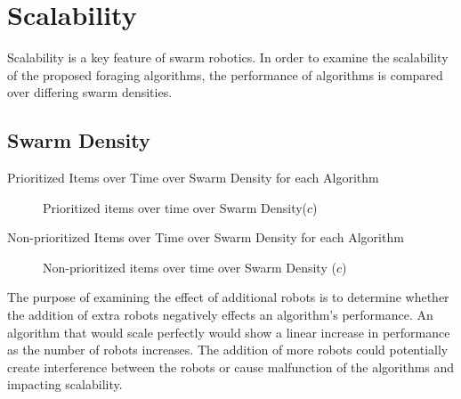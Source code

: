 \section{Scalability}
\label{results:scability}
Scalability is a key feature of swarm robotics. In order to examine the scalability of the proposed foraging algorithms, the performance of algorithms is compared over differing swarm densities. 

\subsection{Swarm Density}
\label{results:numberenvironments}

\begin{table} [h]
     \caption{Prioritized Items over Time over Swarm Density for each Algorithm}
     \label{specializationprioritized}
	\centering
	\footnotesize
	
\end{table}
\begin{figure}[!htb]
\centering
\resizebox{\textwidth}{!}{}
\caption{Prioritized items over time over Swarm Density($c$)}
\label{robotsgoldplot}
\end{figure}

\begin{table} [h]
     \caption{Non-prioritized Items over Time over Swarm Density for each Algorithm}
     \label{specializationnonprioritized}
	\centering
	\footnotesize
	
\end{table}




\begin{figure}[!htb]
\centering
\resizebox{\textwidth}{!}{}
\caption{Non-prioritized items over time over Swarm Density ($c$)}
\label{robotswasteplot}
\end{figure}

The purpose of examining the effect of additional robots is to determine whether the addition of extra robots negatively effects an algorithm's performance. An algorithm that would scale perfectly would show a linear increase in performance as the number of robots increases. The addition of more robots could potentially create interference between the robots or cause malfunction of the algorithms and impacting scalability. 

